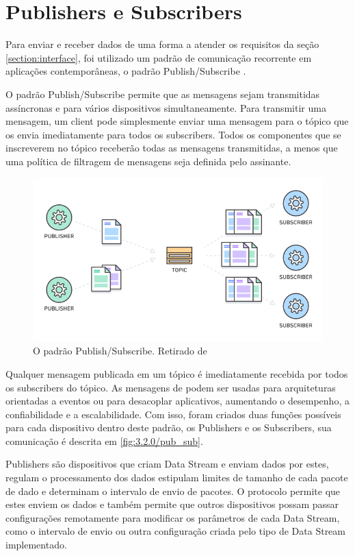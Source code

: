 \section{Publishers e Subscribers}
\label{section:publishers_subscribers}

Para enviar e receber dados de uma forma a atender os requisitos da seção \ref{section:interface}, foi utilizado um padrão de comunicação recorrente em aplicações contemporâneas, o padrão Publish/Subscribe \cite{amazon:pub_sub}.

O padrão Publish/Subscribe permite que as mensagens sejam transmitidas assíncronas e para vários dispositivos simultaneamente. Para transmitir uma mensagem, um client pode simplesmente enviar uma mensagem para o tópico que os envia imediatamente para todos os subscribers. Todos os componentes que se inscreverem no tópico receberão todas as mensagens transmitidas, a menos que uma política de filtragem de mensagens seja definida pelo assinante.

\begin{figure}[h!]
\centering
\includegraphics[width=12cm]{./02_Capitulos/02_Cap3/figures/aws_pub_sub}
\caption{O padrão Publish/Subscribe. Retirado de \cite{amazon:pub_sub}}
\label{fig:3.2.0/aws_pub_sub}
\end{figure}

Qualquer mensagem publicada em um tópico é imediatamente recebida por todos os subscribers do tópico. As mensagens de podem ser usadas para arquiteturas orientadas a eventos ou para desacoplar aplicativos, aumentando  o desempenho, a confiabilidade e a escalabilidade. Com isso, foram criados duas funções possíveis para cada dispositivo dentro deste padrão, os Publishers e os Subscribers, sua comunicação é descrita em \ref{fig:3.2.0/pub_sub}.




Publishers são dispositivos que criam Data Stream  e enviam dados por estes, regulam o processamento dos dados estipulam limites de tamanho de cada pacote de dado e determinam o intervalo de envio de pacotes. O protocolo permite que estes enviem os dados e também permite que outros dispositivos possam passar configurações remotamente para modificar os parâmetros de cada Data Stream, como o intervalo de envio ou outra configuração criada pelo tipo de Data Stream implementado. 


